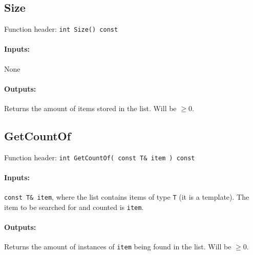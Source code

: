     \begin{framed}
    \subsection{Size}

    Function header: \texttt{int     Size() const}

    \paragraph{Inputs:}
        None

    \paragraph{Outputs:}
        Returns the amount of items stored in the list. Will be $\geq 0$.

    \end{framed}

    
    \begin{framed}
    \subsection{GetCountOf}

    Function header: \texttt{int     GetCountOf( const T\& item ) const}

    \paragraph{Inputs:}
        \texttt{const T\& item}, where the list contains items of type \texttt{T} (it is a template).
        The item to be searched for and counted is \texttt{item}.

    \paragraph{Outputs:}
        Returns the amount of instances of \texttt{item} being found in the list.
        Will be $\geq 0$.

    \end{framed}

    \newpage
    
